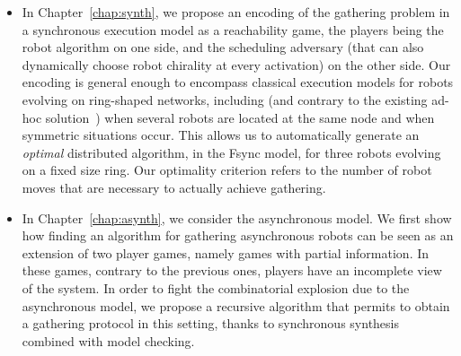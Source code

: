 \begin{itemize}
\item In Chapter~\ref{chap:synth}, we propose an encoding of the gathering problem in a synchronous 
execution model as a reachability game, the players being the robot algorithm 
on one side, and the scheduling adversary (that can also dynamically choose 
robot chirality at every activation) on the other side. Our encoding is 
general enough to encompass classical execution models for robots evolving on 
ring-shaped networks, including (and contrary to the existing ad-hoc solution~\cite{BDPPT12c}) 
when several robots are located at the same node and when symmetric situations occur. 
This allows us to automatically generate an \emph{optimal} distributed algorithm, in the Fsync model, 
for three robots evolving on a fixed size ring. Our optimality criterion refers to the number of robot 
moves that are necessary to actually achieve gathering.
\item In Chapter~\ref{chap:asynth}, we consider the asynchronous model. 
We first show how finding an algorithm for gathering asynchronous robots 
can be seen as an extension of two player games, namely games with partial information. 
In these games, contrary to the previous ones, players have an incomplete view of the system.
In order to fight the combinatorial explosion due to the asynchronous model,
we propose a recursive algorithm that permits to obtain a gathering
protocol in this setting, thanks to synchronous 
synthesis combined with model checking. 
\end{itemize}
	
	
	
	
	
	
	